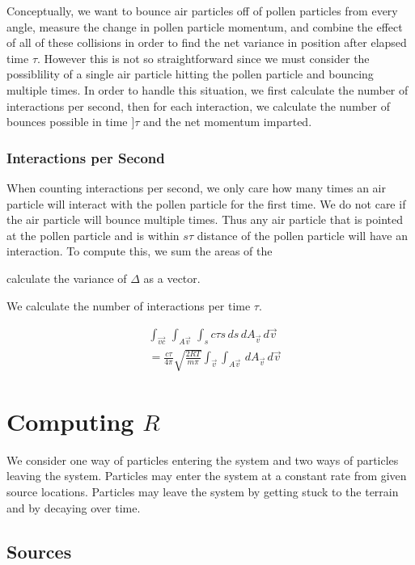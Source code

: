 \documentclass{article}
\begin{document}
Conceptually, we want to bounce air particles off of pollen particles from every angle, measure the change in pollen particle momentum, and combine the effect of all of these collisions in order to find the net variance in position after elapsed time $\tau$. However this is not so straightforward since we must consider the possiblility of a single air particle hitting the pollen particle and bouncing multiple times. In order to handle this situation, we first calculate the number of interactions per second, then for each interaction, we calculate the number of bounces possible in time $]\tau$ and the net momentum imparted.

\subsubsection{Interactions per Second}

When counting interactions per second, we only care how many times an air particle will interact with the pollen particle for the first time. We do not care if the air particle will bounce multiple times. Thus any air particle that is pointed at the pollen particle and is within $s\tau$ distance of the pollen particle will have an interaction. To compute this, we sum the areas of the 

calculate the variance of $\Delta$ as a vector. 


We calculate the number of interactions per time $\tau$.

\begin{align*}
    &{} \int_{\vec{vc}} \, \int_{A\vec{v}} \, \int_s c \tau s \, ds \, dA_{\vec{v}} \, d\vec{v} \\
    &= \frac{c\tau}{4 \pi} \sqrt{\frac{2RT}{m \pi}} \int_{\vec{v}} \int_{A\vec{v}} \, dA_{\vec{v}} \, d\vec{v}
\end{align*}

\section{Computing $R$}

We consider one way of particles entering the system and two ways of particles leaving the system. Particles may enter the system at a constant rate from given source locations. Particles may leave the system by getting stuck to the terrain and by decaying over time.

\subsection{Sources}
\end{document}
